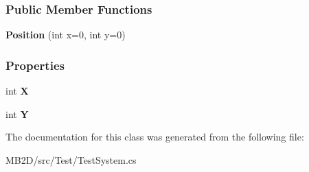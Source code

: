 \subsubsection*{Public Member Functions}
\begin{DoxyCompactItemize}
\item 
\hypertarget{class_m_b2_d_1_1_testing_1_1_position_a2a86f57b1c45aef25e72b684f804ddcb}{}\label{class_m_b2_d_1_1_testing_1_1_position_a2a86f57b1c45aef25e72b684f804ddcb} 
{\bfseries Position} (int x=0, int y=0)
\end{DoxyCompactItemize}
\subsubsection*{Properties}
\begin{DoxyCompactItemize}
\item 
\hypertarget{class_m_b2_d_1_1_testing_1_1_position_ac9f88258d930e34f99538602ff0d069c}{}\label{class_m_b2_d_1_1_testing_1_1_position_ac9f88258d930e34f99538602ff0d069c} 
int {\bfseries X}
\item 
\hypertarget{class_m_b2_d_1_1_testing_1_1_position_ad8e367dcc2f8743e051fd9f4b13f4160}{}\label{class_m_b2_d_1_1_testing_1_1_position_ad8e367dcc2f8743e051fd9f4b13f4160} 
int {\bfseries Y}
\end{DoxyCompactItemize}


The documentation for this class was generated from the following file\+:\begin{DoxyCompactItemize}
\item 
M\+B2\+D/src/\+Test/Test\+System.\+cs\end{DoxyCompactItemize}

